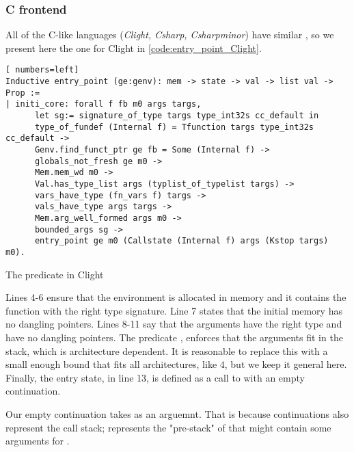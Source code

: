 \subsubsection{C frontend}
All of the C-like languages (\emph{Clight, Csharp, Csharpminor}) have similar , so we present here the one for Clight in \ref{code:entry_point_Clight}.
\begin{table}
\begin{lstlisting}[ numbers=left]
Inductive entry_point (ge:genv): mem -> state -> val -> list val -> Prop :=
| initi_core: forall f fb m0 args targs,
      let sg:= signature_of_type targs type_int32s cc_default in
      type_of_fundef (Internal f) = Tfunction targs type_int32s cc_default ->
      Genv.find_funct_ptr ge fb = Some (Internal f) ->
      globals_not_fresh ge m0 ->
      Mem.mem_wd m0 ->
      Val.has_type_list args (typlist_of_typelist targs) ->
      vars_have_type (fn_vars f) targs ->
      vals_have_type args targs ->
      Mem.arg_well_formed args m0 ->
      bounded_args sg ->
      entry_point ge m0 (Callstate (Internal f) args (Kstop targs) m0).
\end{lstlisting}
\caption{The  predicate in Clight}\label{code:entry_point_Clight}
\end{table}
Lines 4-6 ensure that the environment is allocated in memory and it contains the function  with the right type signature. Line 7 states that the initial memory has no dangling pointers. Lines 8-11 say that the arguments have the right type and have no dangling pointers. The predicate , enforces that the arguments fit in the stack, which is architecture dependent. It is reasonable to replace this with a small enough bound that fits all architectures, like $4$, but we keep it general here. Finally, the entry state, in line 13, is defined as a call to  with an empty continuation.

Our empty continuation  takes  as an arguemnt. That is because continuations also represent the call stack;  represents the "pre-stack" of  that might contain some arguments for .

